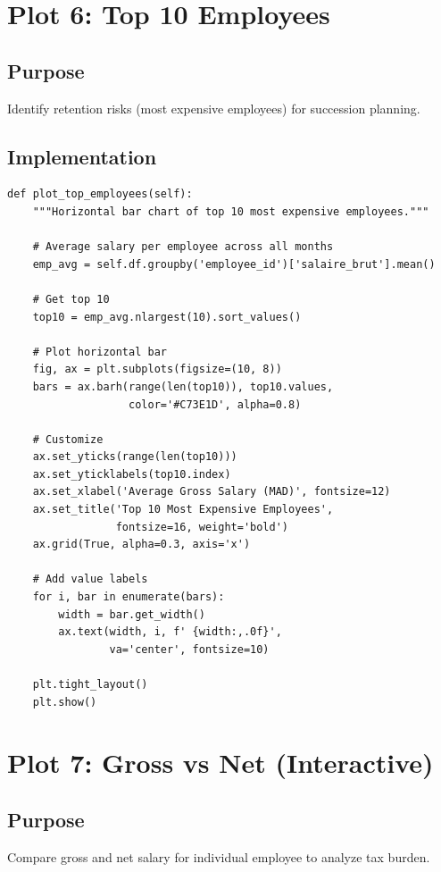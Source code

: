 \section{Plot 6: Top 10 Employees}

\subsection{Purpose}
Identify retention risks (most expensive employees) for succession planning.

\subsection{Implementation}

\begin{lstlisting}[style=pythonstyle]
def plot_top_employees(self):
    """Horizontal bar chart of top 10 most expensive employees."""
    
    # Average salary per employee across all months
    emp_avg = self.df.groupby('employee_id')['salaire_brut'].mean()
    
    # Get top 10
    top10 = emp_avg.nlargest(10).sort_values()
    
    # Plot horizontal bar
    fig, ax = plt.subplots(figsize=(10, 8))
    bars = ax.barh(range(len(top10)), top10.values,
                   color='#C73E1D', alpha=0.8)
    
    # Customize
    ax.set_yticks(range(len(top10)))
    ax.set_yticklabels(top10.index)
    ax.set_xlabel('Average Gross Salary (MAD)', fontsize=12)
    ax.set_title('Top 10 Most Expensive Employees',
                 fontsize=16, weight='bold')
    ax.grid(True, alpha=0.3, axis='x')
    
    # Add value labels
    for i, bar in enumerate(bars):
        width = bar.get_width()
        ax.text(width, i, f' {width:,.0f}',
                va='center', fontsize=10)
    
    plt.tight_layout()
    plt.show()
\end{lstlisting}

\section{Plot 7: Gross vs Net (Interactive)}

\subsection{Purpose}
Compare gross and net salary for individual employee to analyze tax burden.

